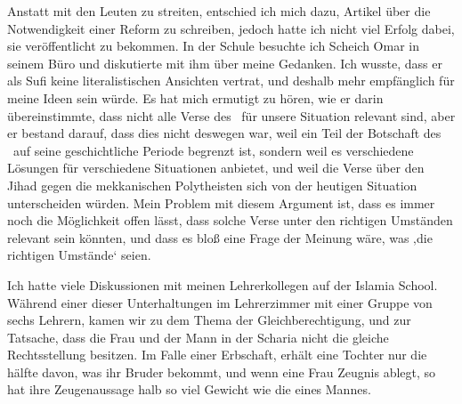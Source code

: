 \documentclass[12pt]{memoir}
\begin{document}
Anstatt mit den Leuten zu streiten, entschied ich mich dazu,
Artikel über die Notwendigkeit einer Reform zu schreiben,
jedoch hatte ich nicht viel Erfolg dabei, sie veröffentlicht zu bekommen.
In der Schule besuchte ich Scheich Omar in seinem Büro
und diskutierte mit ihm über meine Gedanken.
Ich wusste, dass er als Sufi keine literalistischen Ansichten vertrat,
und deshalb mehr empfänglich für meine Ideen sein würde.
Es hat mich ermutigt zu hören, wie er darin übereinstimmte,
dass nicht alle Verse des \Quran\ für unsere Situation relevant sind,
aber er bestand darauf, dass dies nicht deswegen war,
weil ein Teil der Botschaft des \Quran\
auf seine geschichtliche Periode begrenzt ist,
sondern weil es verschiedene Lösungen für verschiedene Situationen anbietet,
und weil die Verse über den Jihad gegen die mekkanischen Polytheisten
sich von der heutigen Situation unterscheiden würden.
Mein Problem mit diesem Argument ist,
dass es immer noch die Möglichkeit offen lässt,
dass solche Verse unter den richtigen Umständen relevant sein könnten,
und dass es bloß eine Frage der Meinung wäre,
was ‚die richtigen Umstände‘ seien.

Ich hatte viele Diskussionen mit meinen Lehrerkollegen
auf der Islamia School.
Während einer dieser Unterhaltungen im Lehrerzimmer
mit einer Gruppe von sechs Lehrern,
kamen wir zu dem Thema der Gleichberechtigung,
und zur Tatsache, dass die Frau und der Mann in der Scharia
nicht die gleiche Rechtsstellung besitzen.
Im Falle einer Erbschaft, erhält eine Tochter nur die hälfte davon,
was ihr Bruder bekommt, und wenn eine Frau Zeugnis ablegt,
so hat ihre Zeugenaussage halb so viel Gewicht wie die eines Mannes.
\end{document}
